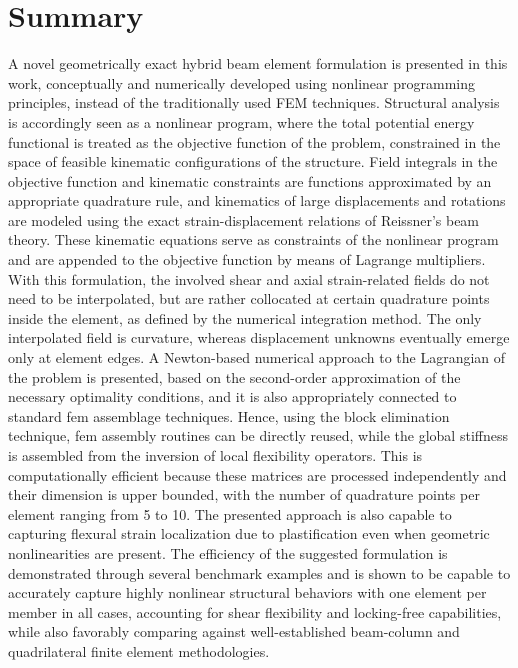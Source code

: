 \section{Summary}
A novel geometrically exact hybrid beam element formulation is presented in 
this work,
conceptually and numerically developed using nonlinear programming principles,
instead of the traditionally used FEM techniques. Structural analysis
is accordingly seen as a nonlinear program, where the total potential energy 
functional is
treated as the objective function of the problem, constrained in the space of
feasible kinematic configurations of the structure. Field integrals in the
objective function and kinematic constraints are functions approximated by an 
appropriate quadrature rule, and
kinematics of large displacements and rotations are modeled using the exact
strain-displacement relations of Reissner's beam theory. These kinematic 
equations serve as
constraints of the nonlinear program and are appended to the objective
function by means of Lagrange multipliers. With this formulation, the
involved shear and axial strain-related fields do not need to be
interpolated, but are rather collocated 
at certain quadrature points
inside the element, as defined by the numerical integration method. The only
interpolated field is curvature, whereas displacement unknowns eventually emerge
only at element edges. A Newton-based numerical approach to the Lagrangian of
the problem is presented, based on the second-order approximation of the 
necessary
optimality conditions, and it is also appropriately connected to
standard \acrshort{fem}
assemblage techniques. Hence, using the block elimination technique, 
\acrshort{fem} assembly 
routines can be 
directly reused, while the global stiffness is assembled from the inversion of 
local
flexibility operators. This is computationally
efficient because these matrices are processed independently and their 
dimension is upper bounded, with the number of quadrature points per element
ranging from 5 to 10. The presented approach is also capable to capturing 
flexural strain localization due to plastification even when geometric 
nonlinearities are present. The efficiency of the suggested formulation is 
demonstrated through several benchmark examples and is shown to be
capable to accurately capture highly nonlinear structural behaviors with one
element per member in all cases, accounting for shear flexibility and 
locking-free capabilities, while also favorably comparing against 
well-established 
beam-column and quadrilateral finite element methodologies.